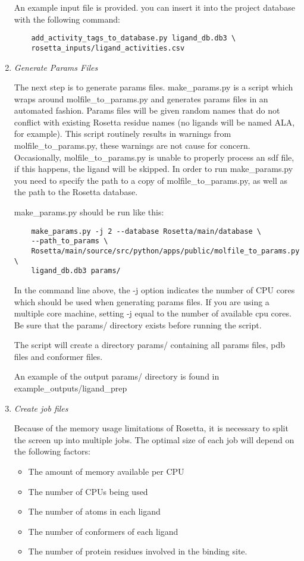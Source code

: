 \begin{enumerate}
	An example input file is provided. you can insert it into the project
	database with the following command:

	\begin{verbatim}
	add_activity_tags_to_database.py ligand_db.db3 \
	rosetta_inputs/ligand_activities.csv
	\end{verbatim}
	\item
	\emph{Generate Params Files}

	The next step is to generate params files. make\_params.py is a script which wraps around molfile\_to\_params.py and generates params files in an automated fashion.
	Params files will be given random names that do not conflict with existing Rosetta residue names (no ligands will be named ALA, for example).
	This script routinely results in warnings from molfile\_to\_params.py, these warnings are not cause for concern.
	Occasionally, molfile\_to\_params.py is unable to properly process an sdf file, if this happens, the ligand will be skipped. 
	In order to run make\_params.py you need to specify the path to a copy of molfile\_to\_params.py, as well as the path to the Rosetta database.
	
	make\_params.py should be run like this:

	\begin{verbatim}
	make_params.py -j 2 --database Rosetta/main/database \
	--path_to_params \
	Rosetta/main/source/src/python/apps/public/molfile_to_params.py \
	ligand_db.db3 params/
	\end{verbatim}

	In the command line above, the -j option indicates the number of CPU cores which should be used when generating params files.
	If you are using a multiple core machine, setting -j equal to the number of available cpu cores.
	Be sure that the params/ directory exists before running the script.

	The script will create a directory params/ containing all params files, pdb files and conformer files.

	An example of the output params/ directory is found in example\_outputs/ligand\_prep
\item
	\emph{Create job files}

	Because of the memory usage limitations of Rosetta, it is necessary to split the screen up into multiple jobs.
	The optimal size of each job will depend on the following factors:

	\begin{itemize}
	\itemsep1pt\parskip0pt\parsep0pt
	\item
 		The amount of memory available per CPU
	\item
    		The number of CPUs being used
	\item
 		The number of atoms in each ligand
	\item
		The number of conformers of each ligand
	\item
		The number of protein residues involved in the binding site.
	\end{itemize}


\end{enumerate}
